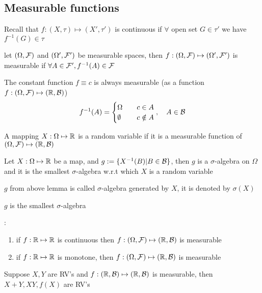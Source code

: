 \subsection{Measurable functions}
Recall that $f:(X, \tau) \mapsto (X', \tau')$ is continuous if $\forall$ open set $G \in \tau'$ we have $f^{-1}(G) \in \tau$
\begin{dfn}
let $(\Omega, \mathcal{F})$ and $(\Omega', \mathcal{F}')$ be measurable spaces, then $f: (\Omega, \mathcal{F}) \mapsto (\Omega', \mathcal{F}')$ is measurable if $\forall A\in \mathcal{F}', f^{-1}(A) \in \mathcal{F}$
\end{dfn}
\begin{example}
The constant function $f \equiv c$ is always measurable (as a function  $f:(\Omega, \mathcal{F}) \mapsto (\mathbb{R}, \mathcal{B})$)
\begin{equation*}
    f^{-1}(A)= \begin{cases}
        \Omega \quad & c\in A \\
        \emptyset \quad & c \notin A
    \end{cases}, \quad A\in \mathcal{B}
\end{equation*}
\end{example}
\begin{dfn}
A mapping $X: \Omega \mapsto \mathbb{R}$ is a random variable if it is a measurable function of $(\Omega, \mathcal{F}) \mapsto (\mathbb{R}, \mathcal{B})$
\end{dfn}
\begin{lem}
Let $X: \Omega \mapsto \mathbb{R}$ be a map, and $g:= \{X^{-1}(B)|B\in \mathcal{B}\}$, then $g$ is a $\sigma$-algebra on $\Omega$ and it is the smallest $\sigma$-algebra w.r.t which $X$ is a random variable
\end{lem}
\begin{dfn}
$g$ from above lemma is called $\sigma$-algebra generated by $X$, it is denoted by $\sigma(X)$
\end{dfn}
\pf $g$ is the smallest $\sigma$-algebra
\newpage
\begin{lem}:
\begin{enumerate}
    \item if $f: \mathbb{R} \mapsto \mathbb{R}$ is continuous then $f: (\Omega, \mathcal{F}) \mapsto (\mathbb{R}, \mathcal{B})$ is measurable
    \item if $f: \mathbb{R} \mapsto \mathbb{R}$ is monotone, then $f: (\Omega, \mathcal{F}) \mapsto (\mathbb{R}, \mathcal{B})$ is measurable
\end{enumerate}
\end{lem}
\begin{prop}
Suppose $X,Y$ are RV's and $f: (\mathbb{R}, \mathcal{B}) \mapsto (\mathbb{R}, \mathcal{B})$ is measurable, then $X+Y, XY, f(X)$ are RV's
\end{prop}
